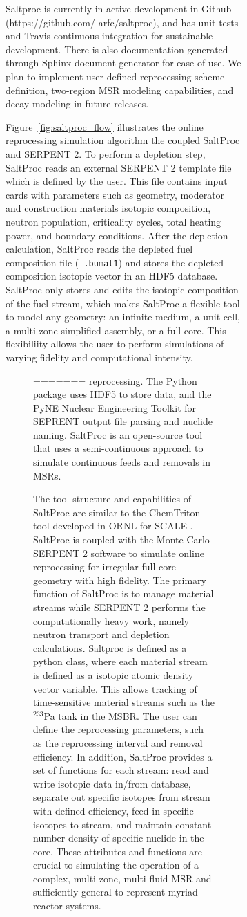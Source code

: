 \begin{figure}[t!]
\begin{figure}[ht!]
Saltproc is currently in active development in Github (https://github.com/ 
arfc/saltproc), and has unit tests and Travis continuous integration for 
sustainable development. There is also documentation
generated through Sphinx document generator for ease of use. We plan to 
implement
user-defined reprocessing scheme definition, two-region \gls{MSR} modeling 
capabilities,
and decay modeling in future releases.

Figure~\ref{fig:saltproc_flow} illustrates the  online reprocessing simulation 
algorithm the 
coupled SaltProc and SERPENT 2. To perform a depletion step,
SaltProc reads an external SERPENT 2 template file which is defined by the user. 
This file 
contains input cards with parameters such as geometry,
moderator and construction materials isotopic composition, neutron population, 
criticality 
cycles, total heating power, and boundary conditions.
After the depletion calculation, SaltProc reads the depleted fuel composition 
file (\texttt{
.bumat1}) and stores the depleted
composition isotopic vector in an HDF5 database. SaltProc only stores and edits 
the isotopic 
composition of the fuel stream,
which makes SaltProc a flexible tool to model any geometry: an infinite medium, 
a unit cell, a 
multi-zone simplified assembly, or a full core.
This flexibiliity allows the user to perform simulations of varying fidelity and 
computational 
intensity.
\begin{figure}[ht!] %
  \centering
=======
 reprocessing.
The Python package uses HDF5 \cite{the_hdf_group_hierarchical_1997} to store 
data, and the PyNE Nuclear Engineering Toolkit \cite{scopatz_pyne:_2012}
for SEPRENT output file parsing and nuclide naming. SaltProc is an open-source tool 
that uses a semi-continuous approach to simulate continuous feeds and removals 
in \glspl{MSR}. 

The tool structure and capabilities of SaltProc are similar to the ChemTriton tool 
developed in \gls{ORNL} for SCALE \cite{powers_new_2013}. SaltProc is coupled 
with the Monte Carlo SERPENT 2
software to simulate online reprocessing for irregular full-core 
geometry with high fidelity.  The primary function of SaltProc is to 
manage material streams while
SERPENT 2 performs the computationally heavy work, namely neutron 
transport and depletion
calculations. Saltproc is defined as a python class, where each material stream 
is defined as a isotopic atomic density
vector variable. This allows tracking of time-sensitive material streams such 
as the
$^{233}$Pa tank in the \gls{MSBR}. The user can define the reprocessing 
parameters, such as the reprocessing interval and removal efficiency.  In 
addition, SaltProc provides a set of functions for each stream: read and write 
isotopic data in/from database, separate out specific isotopes from stream with 
defined efficiency, feed in specific isotopes to stream, and maintain constant 
number density of specific nuclide in the core. These attributes and functions 
are crucial to simulating the operation of a complex, multi-zone, multi-fluid 
\gls{MSR} and sufficiently general to represent myriad reactor systems.


\end{figure}
\end{figure}
\end{figure}
